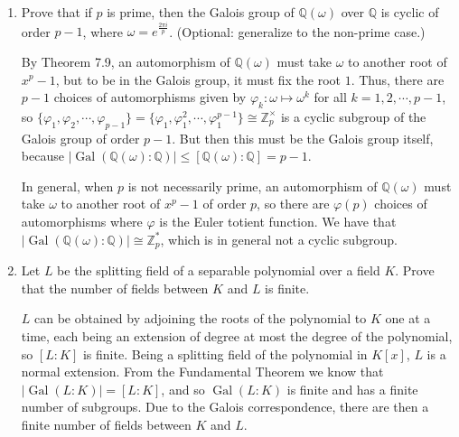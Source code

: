 \documentclass[12pt]{article}
\newcommand{\QQ}{\mathbb{Q}}
\DeclareMathOperator{\Gal}{Gal}
\begin{document}
\begin{enumerate}
    \item
        Prove that if $p$ is prime, then the Galois group of $\QQ(\omega)$ over $\QQ$ is cyclic of order $p-1$, where $\omega = e^\frac{2 \pi i}{p}$. (Optional: generalize to the non-prime case.) \par
        By Theorem 7.9, an automorphism of $\QQ(\omega)$ must take $\omega$ to another root of $x^p - 1$, but to be in the Galois group, it must fix the root $1$. Thus, there are $p - 1$ choices of automorphisms given by $\varphi_k : \omega \mapsto \omega^k$ for all $k = 1, 2, \cdots, p - 1$, %
        so $\{ \varphi_1, \varphi_2, \cdots, \varphi_{p - 1} \} = \{ \varphi_1, \varphi_1^2, \cdots, \varphi_1^{p - 1} \} \cong \mathbb{Z}_p^\times$ is a cyclic subgroup of the Galois group of order $p - 1$. But then this must be the Galois group itself, because $|\Gal(\QQ(\omega) : \QQ)| \leq [\QQ(\omega) : \QQ] = p - 1$. \par
        In general, when $p$ is not necessarily prime, an automorphism of $\QQ(\omega)$ must take $\omega$ to another root of $x^p - 1$ of order $p$, so there are $\varphi(p)$ choices of automorphisms where $\varphi$ is the Euler totient function. We have that $|\Gal(\QQ(\omega) : \QQ)| \cong \mathbb{Z}_p^*$, which is in general not a cyclic subgroup.

    \item
        Let $L$ be the splitting field of a separable polynomial over a field $K$.  Prove that the number of fields between $K$ and $L$ is finite. \par
        $L$ can be obtained by adjoining the roots of the polynomial to $K$ one at a time, each being an extension of degree at most the degree of the polynomial, so $[L : K]$ is finite. Being a splitting field of the polynomial in $K[x]$, $L$ is a normal extension. From the Fundamental Theorem we know that $|\Gal(L : K)| = [L : K]$, and so $\Gal(L : K)$ is finite and has a finite number of subgroups. Due to the Galois correspondence, there are then a finite number of fields between $K$ and $L$. \par


\end{enumerate}
\end{document}
